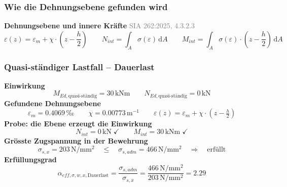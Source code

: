 \documentclass[11pt,a4paper]{article}
\newcommand{\normref}[1]{{\small\textcolor{gray}{#1}}}
\begin{document}
\subsubsection{Wie die Dehnungsebene gefunden wird}
\noindent\textbf{Dehnungsebene und innere Kräfte} \hfill \normref{SIA 262:2025, 4.3.2.3}
\begin{equation*}
\varepsilon(z) = \varepsilon_m + \chi \cdot \left(z - \frac{h}{2}\right) \qquad N_{int} = \int_A \sigma\left(\varepsilon\right)\,\mathrm{d}A \qquad M_{int} = \int_A \sigma\left(\varepsilon\right) \cdot \left(z - \frac{h}{2}\right)\,\mathrm{d}A
\end{equation*}
\subsubsection{Quasi-ständiger Lastfall – Dauerlast}
\noindent\textbf{Einwirkung}
\begin{equation*}
M_{Ed,\text{quasi-ständig}} = 30\,\mathrm{kNm} \qquad N_{Ed,\text{quasi-ständig}} = 0\,\mathrm{kN}
\end{equation*}
\noindent\textbf{Gefundene Dehnungsebene}
\begin{equation*}
\varepsilon_m = 0.4069\,\text{‰} \qquad \chi = 0.00773\,\mathrm{m}^{-1} \qquad \varepsilon(z) = \varepsilon_m + \chi \cdot \left(z - \tfrac{h}{2}\right)
\end{equation*}
\noindent\textbf{Probe: die Ebene erzeugt die Einwirkung}
\begin{equation*}
N_{int} = 0\,\mathrm{kN} \;\checkmark \qquad M_{int} = 30\,\mathrm{kNm} \;\checkmark
\end{equation*}
\noindent\textbf{Grösste Zugspannung in der Bewehrung}
\begin{equation*}
\sigma_{s,x} = 203\,\mathrm{N}/\mathrm{mm}^{2} \quad \le \quad \sigma_{s,adm} = 466\,\mathrm{N}/\mathrm{mm}^{2} \quad \Rightarrow \quad \text{erfüllt}
\end{equation*}
\noindent\textbf{Erfüllungsgrad}
\begin{equation*}
\alpha_{eff,\sigma,w,x,\text{Dauerlast}} = \frac{\sigma_{s,adm}}{\sigma_{s,x}} = \frac{466\,\mathrm{N}/\mathrm{mm}^{2}}{203\,\mathrm{N}/\mathrm{mm}^{2}} = 2.29
\end{equation*}
\end{document}
